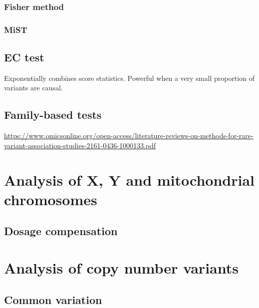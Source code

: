 \documentclass[
]{book}
\begin{document}
\hypertarget{fisher-method}{%
\subsubsection{Fisher method}\label{fisher-method}}

\hypertarget{mist}{%
\subsubsection{MiST}\label{mist}}

\hypertarget{ec-test}{%
\subsection{EC test}\label{ec-test}}

Exponentially combines score statistics. Powerful when a very small proportion of variants are causal.

\hypertarget{family-based-tests}{%
\subsection{Family-based tests}\label{family-based-tests}}

\url{https://www.omicsonline.org/open-access/literature-reviews-on-methods-for-rare-variant-association-studies-2161-0436-1000133.pdf}

\hypertarget{analysis-of-x-y-and-mitochondrial-chromosomes}{%
\section{Analysis of X, Y and mitochondrial chromosomes}\label{analysis-of-x-y-and-mitochondrial-chromosomes}}

\hypertarget{dosage-compensation}{%
\subsection{Dosage compensation}\label{dosage-compensation}}

\hypertarget{analysis-of-copy-number-variants}{%
\section{Analysis of copy number variants}\label{analysis-of-copy-number-variants}}

\hypertarget{common-variation}{%
\subsection{Common variation}\label{common-variation}}
\end{document}
